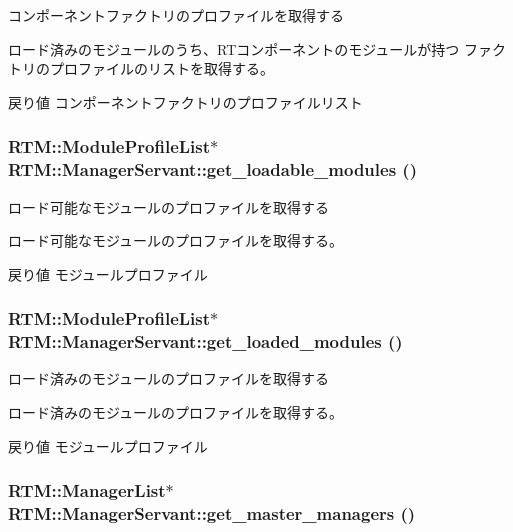 コンポーネントファクトリのプロファイルを取得する 

ロード済みのモジュールのうち、RTコンポーネントのモジュールが持つ ファクトリのプロファイルのリストを取得する。

\begin{DoxyReturn}{戻り値}
コンポーネントファクトリのプロファイルリスト 
\end{DoxyReturn}
\subsubsection[{get\_\-loadable\_\-modules}]{\setlength{\rightskip}{0pt plus 5cm}RTM::ModuleProfileList$\ast$ RTM::ManagerServant::get\_\-loadable\_\-modules ()}\label{classRTM_1_1ManagerServant_a9e0582a658b194f91a80129fea351d8a}


ロード可能なモジュールのプロファイルを取得する 

ロード可能なモジュールのプロファイルを取得する。

\begin{DoxyReturn}{戻り値}
モジュールプロファイル 
\end{DoxyReturn}
\subsubsection[{get\_\-loaded\_\-modules}]{\setlength{\rightskip}{0pt plus 5cm}RTM::ModuleProfileList$\ast$ RTM::ManagerServant::get\_\-loaded\_\-modules ()}\label{classRTM_1_1ManagerServant_a2ccfbcb809e519451a0c04feaba2919e}


ロード済みのモジュールのプロファイルを取得する 

ロード済みのモジュールのプロファイルを取得する。

\begin{DoxyReturn}{戻り値}
モジュールプロファイル 
\end{DoxyReturn}
\subsubsection[{get\_\-master\_\-managers}]{\setlength{\rightskip}{0pt plus 5cm}RTM::ManagerList$\ast$ RTM::ManagerServant::get\_\-master\_\-managers ()}\label{classRTM_1_1ManagerServant_a0e5f79790b6e0a66bb83568d1e98c58f}


